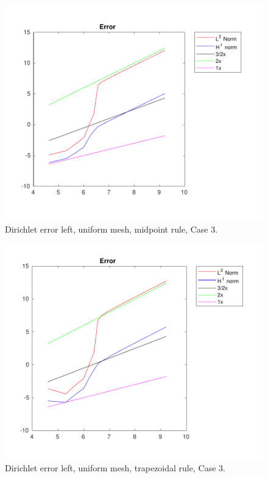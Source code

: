 \documentclass[a4paper]{article}
\numberwithin{equation}{section}
\begin{document}
\begin{figure}[H]
\centering\includegraphics[width=13.5cm]{fig_dirichlet_error_midpoint_cp_uniform_midpoint_C3_M100}
\caption{Dirichlet error left, uniform mesh, midpoint rule, Case 3.}
\end{figure}
\newpage
\begin{figure}[H]
\centering\includegraphics[width=13.5cm]{fig_dirichlet_error_midpoint_cp_uniform_trepozoidal_C3_M100}
\caption{Dirichlet error left, uniform mesh, trapezoidal rule, Case 3.}
\end{figure}
\end{document}
